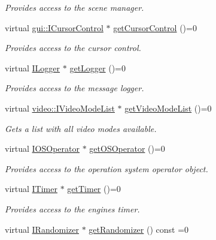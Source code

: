 \begin{DoxyCompactItemize}
\begin{DoxyCompactList}\small\item\em Provides access to the scene manager. \end{DoxyCompactList}\item 
virtual \hyperlink{classirr_1_1gui_1_1ICursorControl}{gui\+::\+I\+Cursor\+Control} $\ast$ \hyperlink{classirr_1_1IrrlichtDevice_a500a3b7bf69487ff7e2075dd0b0db529}{get\+Cursor\+Control} ()=0
\begin{DoxyCompactList}\small\item\em Provides access to the cursor control. \end{DoxyCompactList}\item 
virtual \hyperlink{classirr_1_1ILogger}{I\+Logger} $\ast$ \hyperlink{classirr_1_1IrrlichtDevice_adec0b0b6b71b5066dd2c7039f1f4d85b}{get\+Logger} ()=0
\begin{DoxyCompactList}\small\item\em Provides access to the message logger. \end{DoxyCompactList}\item 
virtual \hyperlink{classirr_1_1video_1_1IVideoModeList}{video\+::\+I\+Video\+Mode\+List} $\ast$ \hyperlink{classirr_1_1IrrlichtDevice_a8872867a5ad728a4673679e9e8f469e7}{get\+Video\+Mode\+List} ()=0
\begin{DoxyCompactList}\small\item\em Gets a list with all video modes available. \end{DoxyCompactList}\item 
virtual \hyperlink{classirr_1_1IOSOperator}{I\+O\+S\+Operator} $\ast$ \hyperlink{classirr_1_1IrrlichtDevice_a3833250e8b0d7a94cd34b1e1809033ac}{get\+O\+S\+Operator} ()=0
\begin{DoxyCompactList}\small\item\em Provides access to the operation system operator object. \end{DoxyCompactList}\item 
virtual \hyperlink{classirr_1_1ITimer}{I\+Timer} $\ast$ \hyperlink{classirr_1_1IrrlichtDevice_a96c30fb7f644e1d1dabff563bde26460}{get\+Timer} ()=0
\begin{DoxyCompactList}\small\item\em Provides access to the engine\textquotesingle{}s timer. \end{DoxyCompactList}\item 
virtual \hyperlink{classirr_1_1IRandomizer}{I\+Randomizer} $\ast$ \hyperlink{classirr_1_1IrrlichtDevice_a5dfd4ee5de202a2b8307252a9da39d8a}{get\+Randomizer} () const  =0

\end{DoxyCompactItemize}
